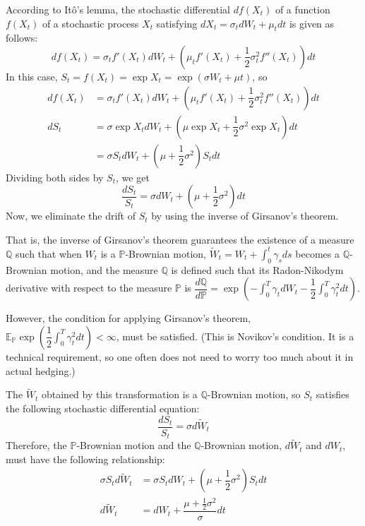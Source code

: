 \documentclass[uplatex,a4j,12pt,dvipdfmx]{jsarticle}
\begin{document}
According to Itô's lemma, the stochastic differential $d f(X_{t})$ of a function $f(X_{t})$ of a stochastic process $X_{t}$ satisfying $d X_{t} = \sigma_{t} d W_{t} + \mu_{t} d t$ is given as follows:
$$d f(X_{t}) = \sigma_{t} f ' ( X_{t} ) d W_{t} + \left( \mu_{t} f ' ( X_{t} ) + \dfrac{1}{2} \sigma^{2}_{t} f'' (X_{t}) \right) dt$$
In this case, $S_{t} = f(X_{t}) = \exp X_{t} = \exp (\sigma W_{t} + \mu t)$, so
\begin{align*}
	d f(X_{t}) & = \sigma_{t} f ' ( X_{t} ) d W_{t} + \left( \mu_{t} f ' ( X_{t} ) + \dfrac{1}{2} \sigma^{2}_{t} f'' (X_{t}) \right) dt \\
	d S_{t}   & = \sigma \exp X_{t} d W_{t} + \left( \mu \exp X_{t} + \dfrac{1}{2} \sigma^{2} \exp X_{t} \right) dt \\
	& = \sigma S_{t} d W_{t} + \left( \mu + \dfrac{1}{2} \sigma^{2} \right) S_{t} dt
\end{align*}
Dividing both sides by $S_{t}$, we get
$$ \dfrac{d S_{t}}{S_{t}} = \sigma d W_{t} + \left( \mu + \dfrac{1}{2} \sigma^{2} \right) dt $$
Now, we eliminate the drift of $S_{t}$ by using the inverse of Girsanov's theorem.

That is,
the inverse of Girsanov's theorem guarantees the existence of a measure $\mathbb{Q}$ such that when $W_{t}$ is a $\mathbb{P}$-Brownian motion, $ \displaystyle \tilde{W}_{t} = W_{t} + \int^{t}_{0} \gamma_{s} ds$ becomes a $\mathbb{Q}$-Brownian motion, and the measure $\mathbb{Q}$ is defined such that its Radon-Nikodym derivative with respect to the measure $\mathbb{P}$ is $\dfrac{d \mathbb{Q}}{d \mathbb{P}} = \exp \left( - \int^{T}_{0} \gamma_{t} d W_{t} - \dfrac{1}{2} \int^{T}_{0} \gamma_{t}^{2} dt \right)$.

However, the condition for applying Girsanov's theorem, $\mathbb{E}_{\mathbb{P}} \exp \left( \dfrac{1}{2} \int^{T}_{0} \gamma_{t}^{2} dt \right) < \infty$, must be satisfied. (This is Novikov's condition. It is a technical requirement, so one often does not need to worry too much about it in actual hedging.)

The $\tilde{W}_{t}$ obtained by this transformation is a $\mathbb{Q}$-Brownian motion, so $S_{t}$ satisfies the following stochastic differential equation:
$$\dfrac{dS_{t}}{S_{t}} = \sigma d \tilde{W}_{t}$$
Therefore, the $\mathbb{P}$-Brownian motion and the $\mathbb{Q}$-Brownian motion, $d \tilde{W}_{t}$ and $d W_{t}$, must have the following relationship:
\begin{align*}
	\sigma S_{t} d \tilde{W}_{t} & = \sigma S_{t} d W_{t} + \left( \mu + \dfrac{1}{2} \sigma^{2} \right) S_{t} dt \\
	d \tilde{W}_{t} & = d W_{t} + \dfrac{ \mu + \frac{1}{2} \sigma^{2} }{\sigma} dt
\end{align*}
\end{document}
